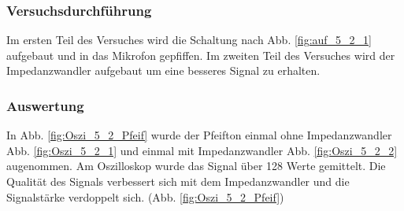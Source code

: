 \documentclass[12pt,a4paper]{article}
\begin{document}
\subsubsection*{Versuchsdurchführung}
Im ersten Teil des Versuches wird die Schaltung nach Abb. \ref{fig:auf_5_2_1} aufgebaut und in das Mikrofon gepfiffen.
Im zweiten Teil des Versuches wird der Impedanzwandler aufgebaut um eine besseres Signal zu erhalten. 
\subsubsection*{Auswertung}
In Abb. \ref{fig:Oszi_5_2_Pfeif} wurde der Pfeifton einmal ohne Impedanzwandler Abb. \ref{fig:Oszi_5_2_1} und einmal mit Impedanzwandler Abb. \ref{fig:Oszi_5_2_2} augenommen. Am Oszilloskop wurde das Signal über 128 Werte gemittelt. Die Qualität des Signals verbessert sich mit dem Impedanzwandler und die Signalstärke verdoppelt sich. (Abb. \ref{fig:Oszi_5_2_Pfeif})
\end{document}
